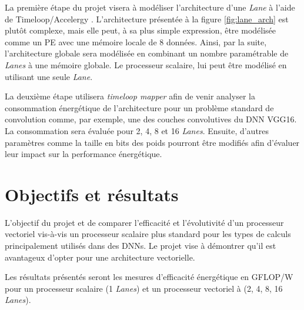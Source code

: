 \documentclass[11pt,letterpaper]{article}
\begin{document}
    La première étape du projet visera à modéliser l'architecture d'une \textit{Lane} à
    l'aide de Timeloop/Accelergy \cite{timeloop}. %
    L'architecture présentée à la figure \ref{fig:lane_arch}
    est plutôt complexe, mais elle peut, à sa plus simple expression, être modélisée comme
    un PE avec une mémoire locale de 8 données. Ainsi, par la suite, l'architecture globale
    sera modélisée en combinant un nombre paramétrable de \textit{Lanes} à une mémoire globale.
    Le processeur scalaire, lui peut être modélisé en utilisant une seule \textit{Lane}.

    La deuxième étape utilisera \textit{timeloop mapper} afin de venir analyser la consommation
    énergétique de l'architecture pour un problème standard de convolution comme, par exemple,
    une des couches convolutives du DNN VGG16. La consommation sera évaluée pour 2, 4, 8 et 16 
    \textit{Lanes}. Ensuite, d'autres paramètres comme la taille en bits des poids pourront
    être modifiés afin d'évaluer leur impact sur la performance énergétique.

    

\section*{Objectifs et résultats}
    L'objectif du projet et de comparer l'efficacité et l'évolutivité d'un processeur 
    vectoriel vis-à-vis un processeur scalaire plus standard pour les types de calculs
    principalement utilisés dans des DNNs. Le projet vise à démontrer qu'il est avantageux
    d'opter pour une architecture vectorielle.

    Les résultats présentés seront les mesures d'efficacité énergétique en GFLOP/W pour
    un processeur scalaire (1 \textit{Lanes}) et un processeur vectoriel à (2, 4, 8, 16 \textit{Lanes}).

{}
    
\end{document}
